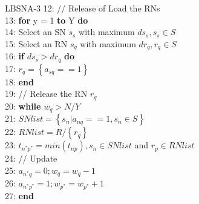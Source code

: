 \documentclass[main.tex]{subfiles}
\begin{document}
\begin{frame}{LBSNA-3}
\footnotesize
12: // Release of Load the RNs\\
13: \textbf{for} y = 1 \textbf{to} Y \textbf{do}\\
14: \hspace{2mm}Select an SN $s_s$ with maximum $ds_s, s_s \in S$\\
15: \hspace{2mm}Select an RN $s_q$ with maximum $dr_q, r_q \in S$\\
16: \hspace{2mm}\textbf{if} $ds_s > dr_q$ \textbf{do}\\
17: \hspace{4mm}$r_q = \left\{a_{sq} == 1\right\}$\\
18: \hspace{2mm}\textbf{end}\\
19: \hspace{2mm}// Release the RN $r_q$\\
20: \hspace{2mm}\textbf{while} $w_q > N/Y$\\
21: \hspace{4mm}$SNlist = \left\{s_n | a_{nq} == 1, s_n \in S\right\}$\\
22: \hspace{4mm}$RNlist = R/\left\{r_q\right\}$\\
23: \hspace{4mm}$t_{n^*p^*} = min(t_{np}), s_n \in SNlist$ and $r_p\in RNlist$\\
24: \hspace{4mm}// Update\\
25: \hspace{4mm}$a_{n^*q} = 0; w_q = w_q - 1$\\
26: \hspace{4mm}$a_{n^*p^*} = 1; w_{p^*} = w_{p^*} + 1$\\
27: \hspace{2mm}\textbf{end}
\end{frame}
\end{document}
